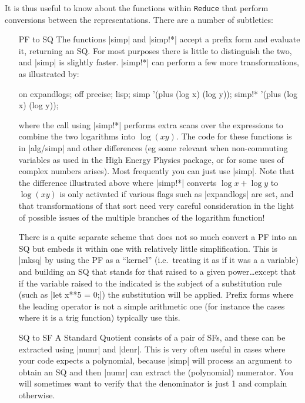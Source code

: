 \documentclass[12pt,twoside,openright]{memoir}
\newcommand{\reduce}{\texttt{Reduce}\xspace}
\begin{document}
It is thus useful to know about the functions within \reduce that perform
conversions between the representations. There are a number of subtleties:
\begin{itemize}
\item[PF to SQ] The functions |simp| and |simp!*| accept a prefix form and
evaluate it, returning an SQ. For most purposes there is little to distinguish
the two, and |simp| is slightly faster. |simp!*| can perform a few more
transformations, as illustrated by:
\begin{rlispverb}
on expandlogs;
off precise;
lisp;
simp '(plus (log x) (log y));
simp!* '(plus (log x) (log y));
\end{rlispverb}
where the call using |simp!*| performs extra scans over the expressions
to combine the two logarithms into $\log(x y)$. The code for these functions
is in |alg/simp| and other differences (eg some relevant when non-commuting
variables as used in the High Energy Physics package, or for some uses
of complex numbers arises). Most frequently you can just use |simp|.
Note that the difference illustrated above where |simp!*| converts
$\log x + \log y$ to $\log (x y)$ is only activated if various flags such as
|expandlogs| are set, and that transformations of that sort need very careful
consideration in the light of possible issues of the multiple branches
of the logarithm function!

There is a quite separate scheme that does not so much convert a PF into
an SQ but embeds it within one with relatively little simplification. This
is |mksq| by using the PF as a ``kernel'' (i.e.\ treating it as if it was a
a variable) and building an SQ that stands for that raised to a given
power\ldots except that if the variable raised to the indicated is the
subject of a substitution rule (such as |let x**5 = 0;|) the substitution
will be applied. Prefix forms where the leading operator is not a simple
arithmetic one (for instance the cases where it is a trig function) typically
use this.

\item[SQ to SF] A Standard Quotient consists of a pair of SFs, and these
can be extracted using |numr| and |denr|. This is very often useful in cases
where your code expects a polynomial, because |simp| will process an argument
to obtain an SQ and then |numr| can extract the (polynomial) numerator. You
will sometimes want to verify that the denominator is just 1 and complain
otherwise.


\end{itemize}
\end{document}
